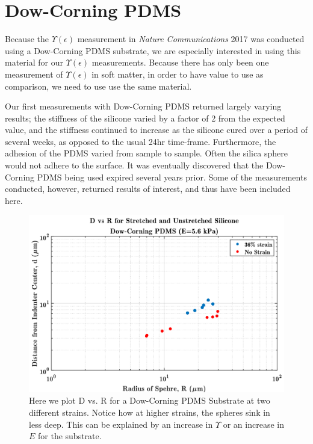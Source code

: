 \break 
\section{Dow-Corning PDMS}
Because the $ \Upsilon(\epsilon) $ measurement in \textit{Nature Communications} 2017 \cite{xu2017direct} was conducted using a Dow-Corning PDMS substrate, we are especially interested in using this material for our $ \Upsilon(\epsilon) $ measurements. Because there has only been one measurement of $ \Upsilon(\epsilon) $ in soft matter, in order to have value to use as comparison, we need to use use the same material. 

Our first measurements with Dow-Corning PDMS returned largely varying results; the stiffness of the silicone varied by a factor of 2 from the expected value, and the stiffness continued to increase as the silicone cured over a period of several weeks, as opposed to the usual 24hr time-frame. Furthermore, the adhesion of the PDMS varied from sample to sample. Often the silica sphere would not adhere to the surface. It was eventually discovered that the Dow-Corning PDMS being used expired several years prior. Some of the measurements conducted, however, returned results of interest, and thus have been included here. 


\begin{figure}[h]
	\centering
	\includegraphics[width=\linewidth]{Chapters/Figures/d_vs_r_stretch_vs_no_stretch_DC181115}
	\caption[D vs. R Dow-Corning]{Here we plot D vs. R for a Dow-Corning PDMS Substrate at two different strains. Notice how at higher strains, the spheres sink in less deep. This can be explained by an increase in $\Upsilon$ or an increase in $E$ for the substrate.}
	\label{fig:dvsrstretchvsnostretchdc181115}
\end{figure}

